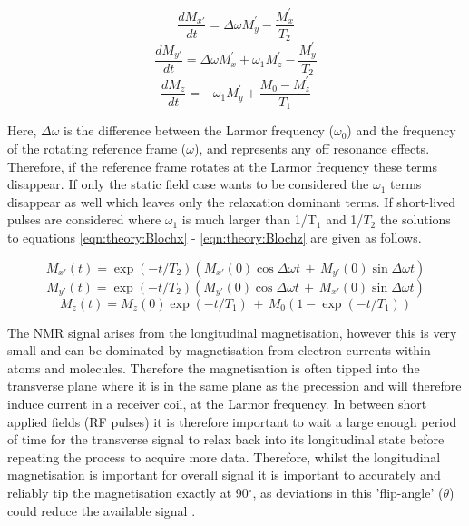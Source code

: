 \documentclass[class=article, crop=false]{standalone}
\begin{document}
\begin{equation}
    \frac{dM_{x'}}{dt} = \Delta\omega M_y^{'} - \frac{M_x^{'}}{T_2}
    \label{eqn:theory:Blochx}
\end{equation}
\begin{equation}
    \frac{dM_{y'}}{dt} = \Delta\omega M_x^{'} + \omega_1M_z^{'} - \frac{M_y^{'}}{T_2}
    \label{eqn:theory:Blochy}
\end{equation}
\begin{equation}
    \frac{dM_z}{dt} = -\omega_1M_y^{'} + \frac{M_0-M_z^{'}}{T_1}
    \label{eqn:theory:Blochz}
\end{equation}

Here, $\Delta\omega$ is the difference between the Larmor frequency ($\omega_0$) and the frequency of the rotating reference frame ($\omega$), and represents any off resonance effects. Therefore, if the reference frame rotates at the Larmor frequency these terms disappear. If only the static field case wants to be considered the $\omega_1$ terms disappear as well which leaves only the relaxation dominant terms. If short-lived pulses are considered where $\omega_1$ is much larger than 1/T$_1$ and 1/$T_2$ the solutions to equations \ref{eqn:theory:Blochx} - \ref{eqn:theory:Blochz} are given as follows.

\begin{equation}
    M_{x'}(t) = \exp(-t/T_2) \left( M_{x'}(0)\cos\Delta\omega t \, + \, M_{y'}(0)\sin\Delta\omega t \right)
\end{equation}
\begin{equation}
    M_{y'}(t) = \exp(-t/T_2) \left( M_{y'}(0)\cos\Delta\omega t \, + \, M_{x'}(0)\sin\Delta\omega t \right)
\end{equation}
\begin{equation}
    M_z(t) = M_z(0)\exp(-t/T_1) \, + \, M_0 \left( 1-\exp(-t/T_1) \right)
\end{equation}

The NMR signal arises from the longitudinal magnetisation, however this is very small and can be dominated by magnetisation from electron currents within atoms and molecules. Therefore the magnetisation is often tipped into the transverse plane where it is in the same plane as the precession and will therefore induce current in a receiver coil, at the Larmor frequency. In between short applied fields (RF pulses) it is therefore important to wait a large enough period of time for the transverse signal to relax back into its longitudinal state before repeating the process to acquire more data. Therefore, whilst the longitudinal magnetisation is important for overall signal it is important to accurately and reliably tip the magnetisation exactly at 90$^\circ$, as deviations in this 'flip-angle' ($\theta$) could reduce the available signal \cite{deGraaf2019InSpectroscopy}.
\end{document}
